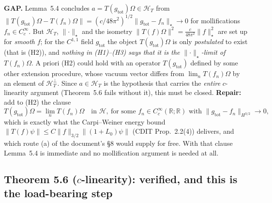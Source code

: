 \documentclass[11pt]{article}
\newcommand{\HT}{\mathcal H_T}
\newcommand{\norm}[1]{\lVert#1\rVert}
\newcommand{\Hil}{\mathcal H}
\newcommand{\Om}{\Omega}
\newcommand{\gtot}{g_{\mathrm{tot}}}
\begin{document}
\begin{verdictgap}
\textbf{GAP.}  Lemma~5.4 concludes $a=T(\gtot)\Om\in\HT$ from
$\norm{T(\gtot)\Om-T(f_n)\Om}=(c/48\pi^2)^{1/2}\norm{\gtot-f_n}_\star\to0$ for mollifications
$f_n\in C^\infty_c$.  But $\HT$, $\norm\cdot_\star$ and the isometry
$\norm{T(f)\Om}^2=\frac c{48\pi^2}\norm f_\star^2$ are set up for \emph{smooth} $f$; for the $C^{1,1}$ field
$\gtot$ the object $T(\gtot)\Om$ is only \emph{postulated} to exist (that is (H2)), and \emph{nothing in
(H1)--(H3) says that it is the $\norm\cdot_\star$-limit of $T(f_n)\Om$}.  A priori (H2) could hold with an
operator $T(\gtot)$ defined by some other extension procedure, whose vacuum vector differs from
$\lim_nT(f_n)\Om$ by an element of $\HT^\perp$.  Since $a\in\HT$ is the hypothesis that carries the
\emph{entire} $c$-linearity argument (Theorem~5.6 fails without it), this must be closed.
\textbf{Repair:} add to (H2) the clause
\[
 T(\gtot)\Om=\lim_{n}T(f_n)\Om\quad\text{in }\Hil,\ \text{for some }f_n\in C^\infty_c(\mathbb R;\mathbb R)
 \text{ with }\norm{\gtot-f_n}_{H^{3/2}}\to0,
\]
which is exactly what the Carpi--Weiner energy bound $\norm{T(f)\psi}\le C\norm f_{3/2}\norm{(1+L_0)\psi}$
(CDIT Prop.~2.2(4)) delivers, and which route (a) of the document's \S8 would supply for free.  With that
clause Lemma~5.4 is immediate and no mollification argument is needed at all.
\end{verdictgap}

\subsection{Theorem 5.6 ($c$-linearity): verified, and this is the load-bearing step}
\end{document}
